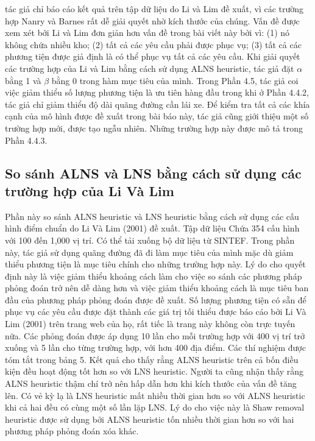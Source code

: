 tác giả chỉ báo cáo kết quả trên tập dữ liệu do Li và Lim đề xuất, vì các trường hợp Nanry và Barnes rất dễ giải quyết nhờ kích thước của chúng.
Vấn đề được xem xét bởi Li và Lim đơn giản hơn vấn đề trong bài viết này bởi vì: (1) nó không chứa nhiều kho; (2) tất cả các yêu cầu phải được phục vụ; (3) tất cả các phương tiện được giả định là có thể phục vụ tất cả các yêu cầu. Khi giải quyết các trường hợp của Li và Lim bằng cách sử dụng ALNS heuristic, tác giả đặt $\alpha$ bằng 1 và $\beta$ bằng 0 trong hàm mục tiêu của mình. Trong Phần 4.5, tác giả coi việc giảm thiểu số lượng phương tiện là ưu tiên hàng đầu trong khi ở Phần 4.4.2, tác giả chỉ giảm thiểu độ dài quãng đường cần lái xe.
Để kiểm tra tất cả các khía cạnh của mô hình được đề xuất trong bài báo này, tác giả cũng giới thiệu một số trường hợp mới, được tạo ngẫu nhiên. Những trường hợp này được mô tả trong Phần 4.4.3.

\subsection{So sánh ALNS và LNS bằng cách sử dụng các trường hợp của Li Và Lim}
Phần này so sánh ALNS heuristic và LNS heuristic bằng cách sử dụng các cấu hình điểm chuẩn do Li Và Lim (2001) đề xuất. Tập dữ liệu Chứa 354 cấu hình với 100 đến 1,000 vị trí. Có thể tải xuống bộ dữ liệu từ SINTEF.
Trong phần này, tác giả sử dụng quãng đường đã đi làm mục tiêu của mình mặc dù giảm thiểu phương tiện là mục tiêu chính cho những trường hợp này. Lý do cho quyết định này là việc giảm thiểu khoảng cách làm cho việc so sánh các phương pháp phỏng đoán trở nên dễ dàng hơn và việc giảm thiểu khoảng cách là mục tiêu ban đầu của phương pháp phỏng đoán được đề xuất. Số lượng phương tiện có sẵn để phục vụ các yêu cầu được đặt thành các giá trị tối thiểu được báo cáo bởi Li Và Lim (2001) trên trang web của họ, rất tiếc là trang này không còn trực tuyến nữa. Các phỏng đoán được áp dụng 10 lần cho mỗi trường hợp với 400 vị trí trở xuống và 5 lần cho từng trường hợp, với hơn 400 địa điểm. Các thí nghiệm được tóm tắt trong bảng 5.
Kết quả cho thấy rằng ALNS heuristic trên cả bốn điều kiện đều hoạt động tốt hơn so với LNS heuristic. Người ta cũng nhận thấy rằng ALNS heuristic thậm chí trở nên hấp dẫn hơn khi kích thước của vấn đề tăng lên. Có vẻ kỳ lạ là LNS heuristic mất nhiều thời gian hơn so với ALNS heuristic khi cả hai đều có cùng một số lần lặp LNS. Lý do cho việc này là Shaw removal heuristic được sử dụng bởi ALNS heuristic tốn nhiều thời gian hơn so với hai phương pháp phỏng đoán xóa khác.

